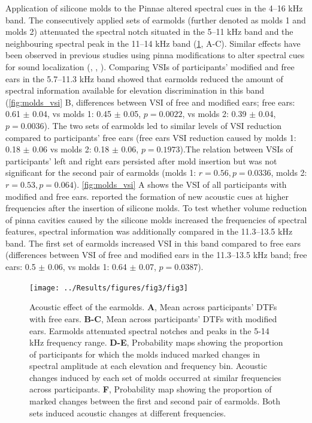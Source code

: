 Application of silicone molds to the Pinnae altered spectral cues in the 4–16 kHz band. The consecutively applied sets of earmolds (further denoted as molds 1 and molds 2) attenuated the spectral notch situated in the 5–11 kHz band and the neighbouring spectral peak in the 11–14 kHz band (\cref{fig:spectral_change}, A-C). Similar effects have been observed in previous studies using pinna modifications to alter spectral cues for sound localization (\citet{trapeau_fast_2016}, \citet{wanrooij_relearning_2005}, \citet{hofman_relearning_1998}). Comparing VSIs of participants' modified and free ears in the 5.7–11.3 kHz band showed that earmolds reduced the amount of spectral information available for elevation discrimination in this band (\cref{fig:molds_vsi} B, differences between VSI of free and modified ears; free ears: 0.61 $\pm$ 0.04, vs molds 1: 0.45 $\pm$ 0.05, $p = 0.0022$, vs molds 2: 0.39 $\pm$ 0.04, $p = 0.0036$). The two sets of earmolds led to similar levels of VSI reduction compared to participants' free ears (free ears VSI reduction caused by molds 1: 0.18 $\pm$ 0.06 vs molds 2: 0.18 $\pm$ 0.06, $p = 0.1973$).The relation between VSIs of participants' left and right ears persisted after mold insertion but was not significant for the second pair of earmolds (molds 1: $r = 0.56, p = 0.0336$, molds 2: $r = 0.53, p = 0.064$). \cref{fig:molds_vsi} A shows the VSI of all participants with modified and free ears. \citet{wanrooij_relearning_2005} reported the formation of new acoustic cues at higher frequencies after the insertion of silicone molds. To test whether volume reduction of pinna cavities caused by the silicone molds increased the frequencies of spectral features, spectral information was additionally compared in the 11.3–13.5 kHz band. The first set of earmolds increased VSI in this band compared to free ears (differences between VSI of free and modified ears in the 11.3–13.5 kHz band; free ears: 0.5 $\pm$ 0.06, vs molds 1: 0.64 $\pm$ 0.07, $p = 0.0387$).

\begin{figure}[hb]
\centering
	\centerline{\texttt{[image: ../Results/figures/fig3/fig3]}}
	\caption{Acoustic effect of the earmolds. \textbf{A}, Mean across participants' DTFs with free ears. \textbf{B-C}, Mean across participants' DTFs with modified ears. Earmolds attenuated spectral notches and peaks in the 5-14 kHz frequency range. \textbf{D-E}, Probability maps showing the proportion of participants for which the molds induced marked changes in spectral amplitude at each elevation and frequency bin. Acoustic changes induced by each set of molds occurred at similar frequencies across participants. \textbf{F}, Probability map showing the proportion of marked changes between the first and second pair of earmolds. Both sets induced acoustic changes at different frequencies.}
        \label{fig:spectral_change}
\end{figure}
